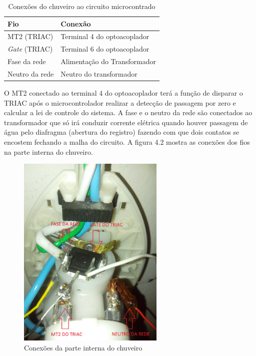 \begin{table}[!hbt] 
   \centering   %
   \setlength{\arrayrulewidth}{1\arrayrulewidth}
   \setlength{\belowcaptionskip}{5pt}
   
   \renewcommand{\arraystretch}{2}
   
   \caption{Conexões do chuveiro ao circuito microcontrado}
   \begin{tabular}{|l|l|} %
      \hline
      \textbf{Fio} &\textbf{Conexão} \\
      \hline 
      MT2 (TRIAC) & Terminal 4 do optoacoplador \\ 
     \hline
      \textit{Gate} (TRIAC) & Terminal 6 do optoacoplador \\
      \hline 
      Fase da rede & Alimentação do Transformador \\  
      \hline 
      Neutro da rede &	Neutro do transformador\\
      \hline
   \end{tabular}
   \label{Conexões do chuveiro ao circuito microcontrado}
\end{table}

O MT2 conectado ao terminal 4 do optoacoplador terá a função de disparar o TRIAC após o microcontrolador realizar a detecção de passagem por zero e calcular a lei de controle do sistema. A fase e o neutro da rede são conectados ao transformador que só irá conduzir corrente elétrica quando houver passagem de água pelo diafragma (abertura do registro) fazendo com que dois contatos se encostem fechando a malha do circuito. A figura 4.2 mostra as conexões dos fios na parte interna do chuveiro.

\begin{figure}[H]

\center

\includegraphics[width=7cm]{imagens/Chuveiro_INTERNO.jpg}

\label{Conexões da parte interna do chuveiro}

\caption{Conexões da parte interna do chuveiro}

\end{figure}

